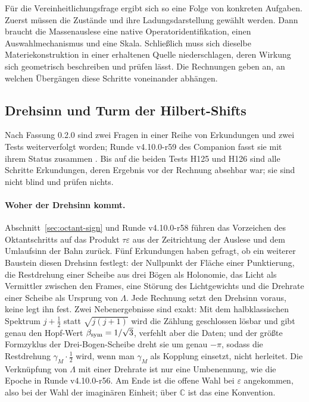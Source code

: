 Für die Vereinheitlichungsfrage ergibt sich so eine Folge von konkreten Aufgaben. Zuerst müssen die Zustände und ihre Ladungsdarstellung gewählt werden. Dann braucht die Massenauslese eine native Operatoridentifikation, einen Auswahlmechanismus und eine Skala. Schließlich muss sich dieselbe Materiekonstruktion in einer erhaltenen Quelle niederschlagen, deren Wirkung sich geometrisch beschreiben und prüfen lässt. Die Rechnungen geben an, an welchen Übergängen diese Schritte voneinander abhängen.

\subsection{Drehsinn und Turm der Hilbert-Shifts}
\label{sec:handedness-tower}

Nach Fassung 0.2.0 sind zwei Fragen in einer Reihe von Erkundungen und zwei Tests weiterverfolgt worden; Runde v4.10.0-r59 des Companion
fasst sie mit ihrem Status zusammen \cite{towerlayer}. Bis auf die beiden Tests H125 und H126 sind alle Schritte Erkundungen, deren Ergebnis
vor der Rechnung absehbar war; sie sind nicht blind und prüfen nichts.

\paragraph{Woher der Drehsinn kommt.}
Abschnitt~\ref{sec:octant-sign} und Runde v4.10.0-r58 führen das Vorzeichen des Oktantschritts auf das Produkt \(\tau\varepsilon\) aus der
Zeitrichtung der Auslese und dem Umlaufsinn der Bahn zurück. Fünf Erkundungen haben gefragt, ob ein weiterer Baustein diesen Drehsinn
festlegt: der Nullpunkt der Fläche einer Punktierung, die Restdrehung einer Scheibe aus drei Bögen als Holonomie, das Licht als Vermittler
zwischen den Frames, eine Störung des Lichtgewichts und die Drehrate einer Scheibe als Ursprung von \(\Lambda\). Jede Rechnung setzt den
Drehsinn voraus, keine legt ihn fest. Zwei Nebenergebnisse sind exakt: Mit dem halbklassischen Spektrum \(j+\tfrac12\) statt
\(\sqrt{j(j+1)}\) wird die Zählung geschlossen lösbar und gibt genau den Hopf-Wert \(\beta_{\rm sym}=1/\sqrt3\), verfehlt aber die Daten;
und der größte Formzyklus der Drei-Bogen-Scheibe dreht sie um genau \(-\pi\), sodass die Restdrehung \(\gamma_M\cdot\tfrac12\) wird, wenn man
\(\gamma_M\) als Kopplung einsetzt, nicht herleitet. Die Verknüpfung von \(\Lambda\) mit einer Drehrate ist nur eine Umbenennung, wie die
Epoche in Runde v4.10.0-r56. Am Ende ist die offene Wahl bei \(\varepsilon\) angekommen, also bei der Wahl der imaginären Einheit; über
\(\mathbb C\) ist das eine Konvention.

